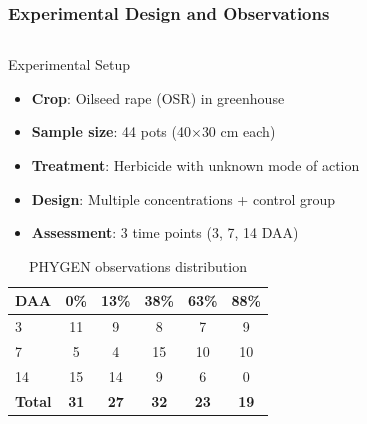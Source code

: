 \documentclass[aspectratio=43]{beamer}
\begin{document}
\begin{frame}
    \frametitle{Experimental Design and Observations}
    
    \begin{columns}
        \begin{column}{0.6\textwidth}
            \begin{block}{Experimental Setup}
                \scriptsize
                \begin{itemize}
                    \item \textbf{Crop}: Oilseed rape (OSR) in greenhouse
                    \item \textbf{Sample size}: 44 pots (40\ensuremath{\times}30 cm each)
                    \item \textbf{Treatment}: Herbicide with unknown mode of action
                    \item \textbf{Design}: Multiple concentrations + control group
                    \item \textbf{Assessment}: 3 time points (3, 7, 14 DAA)
                \end{itemize}
            \end{block}
            
            \begin{table}[H]
                \centering
                \scriptsize
                \caption{PHYGEN observations distribution}
                \begin{tabular}{|l|c|c|c|c|c|}
                \hline
                \textbf{DAA} & \textbf{0\%} & \textbf{13\%} & \textbf{38\%} & \textbf{63\%} & \textbf{88\%} \\
                \hline
                3 & 11 & 9 & 8 & 7 & 9 \\
                7 & 5 & 4 & 15 & 10 & 10 \\
                14 & 15 & 14 & 9 & 6 & 0 \\
                \hline
                \textbf{Total} & \textbf{31} & \textbf{27} & \textbf{32} & \textbf{23} & \textbf{19} \\
                \hline
                \end{tabular}
            \end{table}
        \end{column}
        

\end{columns}
\end{frame}
\end{document}
